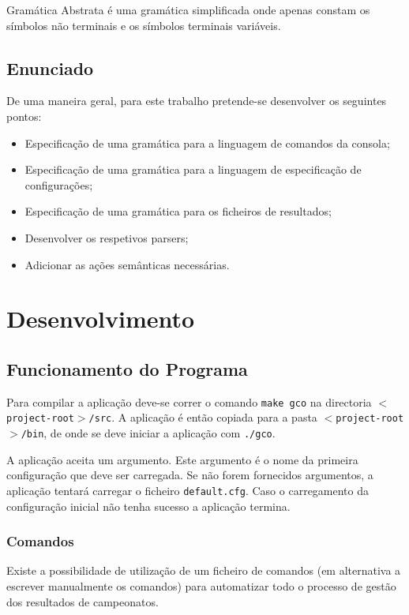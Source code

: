 \documentclass[11pt, a4paper, oneside]{article}
\begin{document}
Gramática Abstrata é uma gramática simplificada onde apenas constam os símbolos não terminais e os símbolos terminais variáveis.

\subsection{Enunciado}

De uma maneira geral, para este trabalho pretende-se desenvolver os seguintes pontos:

\begin{itemize}
\item Especificação de uma gramática para a linguagem de comandos da consola;
\item Especificação de uma gramática para a linguagem de especificação de configurações;
\item Especificação de uma gramática para os ficheiros de resultados;
\item Desenvolver os respetivos parsers;
\item Adicionar as ações semânticas necessárias.
\end{itemize}

\newpage
\section{Desenvolvimento}

\subsection{Funcionamento do Programa}

Para compilar a aplicação deve-se correr o comando \texttt{make gco} na directoria \texttt{$<$project-root$>$/src}. A aplicação é então copiada para a pasta \texttt{$<$project-root$>$/bin}, de onde se deve iniciar a aplicação com \texttt{./gco}.

A aplicação aceita um argumento. Este argumento é o nome da primeira configuração que deve ser carregada. Se não forem fornecidos argumentos, a aplicação tentará carregar o ficheiro \texttt{default.cfg}. Caso o carregamento da configuração inicial não tenha sucesso a aplicação termina.

\subsubsection{Comandos}
Existe a possibilidade de utilização de um ficheiro de comandos (em alternativa a escrever manualmente os comandos) para automatizar todo o processo de gestão dos resultados de campeonatos.
\end{document}
